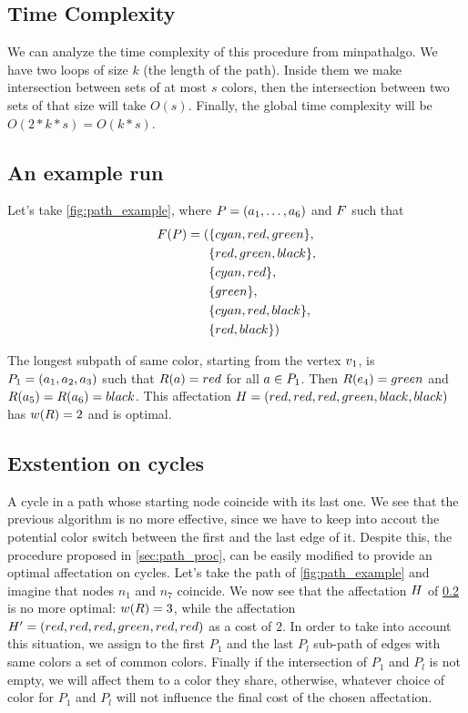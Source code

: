 \subsection{Time Complexity}

We can analyze the time complexity of this procedure from \refname{minpathalgo}. We have two loops of size $k$ (the length of the path). Inside them we make intersection between sets of at most $s$ colors, then the intersection between two sets of that size will take $O(s)$. Finally, the global time complexity will be $O(2 * k * s) = O(k*s)$.

\subsection{An example run}
\label{sec:path_ex_run}



Let's take \cref{fig:path_example}, where $P = (a_1,\ldots,a_{6})$ and $F$ such that
\begin{align*}
  F(P) = ( & \{cyan,red,green\},    \\
                   & \{red,green,black\},    \\
                   & \{cyan,red\},    \\
                   & \{green\},    \\
                   & \{cyan,red,black\},    \\
                   & \{red,black\}   )
\end{align*}

The longest subpath of same color, starting from the vertex $v_1$, is $P_1 = (a_1, a_2, a_3)$ such that $R(a) = red$ for all $a \in P_1$. Then $R(e_4) = green$ and $R(a_5) = R(a_6) = black$. This affectation $H = (red, red, red, green, black, black)$ has $w(R) = 2$ and is optimal.

\subsection{Exstention on cycles}

A cycle in a path whose starting node coincide with its last one.
We see that the previous algorithm is no more effective, since we have to keep into accout the potential color switch between the first and the last edge of it.
Despite this, the procedure proposed in \cref{sec:path_proc}, can be easily modified to provide an optimal affectation on cycles.
Let's take the path of \cref{fig:path_example} and imagine that nodes $n_1$ and $n_7$ coincide.
We now see that the affectation $H$ of \cref{sec:path_ex_run} is no more optimal: $w(R) = 3$, while the affectation $H' = (red, red, red, green, red, red)$ as a cost of $2$.
In order to take into account this situation, we assign to the first $P_1$ and the last $P_l$ sub-path of edges with same colors a set of common colors. Finally if the intersection of $P_1$ and $P_l$ is not empty, we will affect them to a color they share, otherwise, whatever choice of color for $P_1$ and $P_l$ will not influence the final cost of the chosen affectation.

